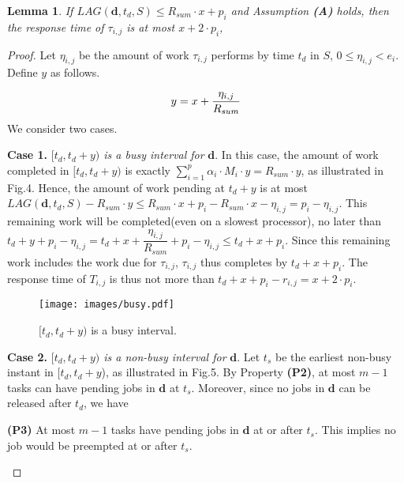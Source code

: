 \documentclass[Times, 10pt,twocolumn]{article}
\newtheorem{lemma}{\textbf{Lemma}}
\theoremstyle{definition}
\begin{document}
\begin{lemma}
\label{lower_bound}
If $LAG(\textbf{d}, t_d, {S}) \leq R_{sum} \cdot x +p_i$ and Assumption \textbf{(A)} holds, then the response time of $\tau_{i,j}$ is at most $x + 2 \cdot p_i$,
\end{lemma}
\begin{proof}
Let $\eta_{i,j}$ be the amount of work $\tau_{i,j}$ performs by time $t_d$ in ${S}$, $0 \leq \eta_{i,j} < e_i$. Define $y$ as follows.

\begin{equation}\vspace{-1mm}
\label{eq:y}
y = x + \dfrac{\eta_{i,j}}{R_{sum}}
\end{equation}
We consider two cases.

\vspace{1mm}
\textbf{Case 1.} \textit{$[t_d, t_d + y)$ is a busy interval for} $\textbf{d}$. In this case, the amount of work completed in $[t_d,t_d+y)$ is exactly $\sum_{i=1}^{p}\alpha_{i} \cdot M_{i} \cdot y = R_{sum} \cdot y$, as illustrated in Fig.4. Hence, the amount of work pending at $t_d+y$ is at most $LAG(\textbf{d}, t_d, {S}) - R_{sum} \cdot y \leq R_{sum} \cdot x + p_i - R_{sum} \cdot x - \eta_{i,j}  = p_i -\eta_{i,j}$. This remaining work will be completed(even on a slowest processor), no later than $t_d+y+p_i -\eta_{i,j} = t_d + x + \dfrac{\eta_{i,j}}{R_{sum}} +p_i -\eta_{i,j} \leq t_d+x+p_i$. Since this remaining work includes the work due for $\tau_{i,j}$, $\tau_{i,j}$ thus completes by $t_d+x+p_i$. The response time of $T_{i,j}$ is thus not more than $t_d+x+p_i-r_{i,j}= x+2 \cdot p_i$. 

\begin{figure}[t]
	\begin{center}
	\texttt{[image: images/busy.pdf]} 
	\end{center} 
\vspace{-2mm}
\caption{\small $[t_d, t_d+y)$ is a busy interval.}
\vspace{-2mm}
\label{fig:busy}
\end{figure}



\vspace{1mm}
\textbf{Case 2.} \textit{$[t_d, t_d + y)$ is a non-busy interval for} $\textbf{d}$. Let $t_s$ be the earliest non-busy instant in $[t_d, t_d + y$), as illustrated in Fig.5. By Property \textbf{(P2)}, at most $m-1$ tasks can have pending jobs in $\textbf{d}$ at $t_s$. Moreover, since no jobs in $\textbf{d}$ can be released after $t_d$, we have
\vspace{-3mm}
\begin{changemargin}{8mm}{8mm}
\textbf{(P3)} At most $m-1$ tasks have pending jobs  in $\textbf{d}$ at or after $t_s$. This implies no job would be preempted at or after $t_s$.
\end{changemargin}\vspace{-3mm}


\end{proof}
\end{document}
